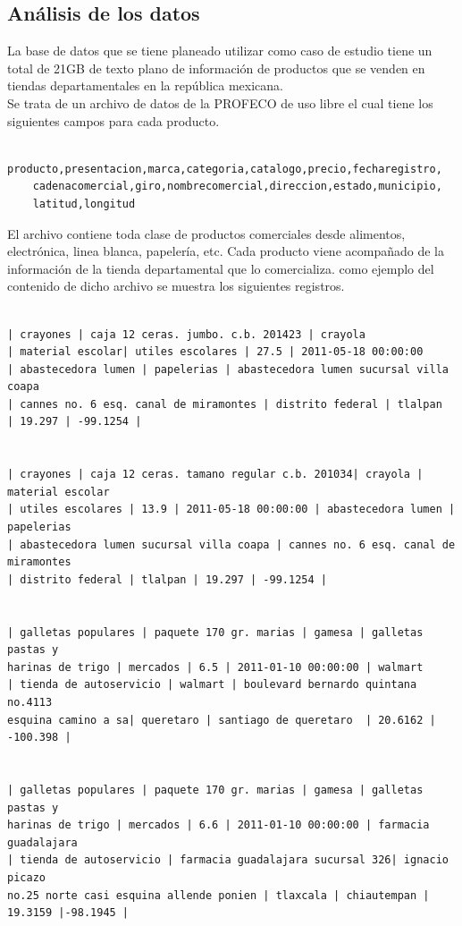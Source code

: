 \subsection{Análisis de los datos}
La base de datos que se tiene planeado utilizar como caso de estudio tiene un total de 21GB de texto plano de información de productos que se venden en tiendas departamentales en la república mexicana. 
\\
Se trata de un archivo de datos de la PROFECO de uso libre el cual tiene los siguientes campos para cada producto.
\begin{lstlisting} 
	producto,presentacion,marca,categoria,catalogo,precio,fecharegistro,
	cadenacomercial,giro,nombrecomercial,direccion,estado,municipio,
	latitud,longitud
\end{lstlisting}
El archivo contiene toda clase de productos comerciales desde alimentos, electrónica, linea blanca, papelería, etc. 
Cada producto viene acompañado de la información de la tienda departamental que lo comercializa.
como ejemplo del contenido de dicho archivo se muestra los siguientes registros.
\begin{lstlisting} 

| crayones | caja 12 ceras. jumbo. c.b. 201423 | crayola 
| material escolar| utiles escolares | 27.5 | 2011-05-18 00:00:00 
| abastecedora lumen | papelerias | abastecedora lumen sucursal villa coapa 
| cannes no. 6 esq. canal de miramontes | distrito federal | tlalpan 
| 19.297 | -99.1254 |


| crayones | caja 12 ceras. tamano regular c.b. 201034| crayola | material escolar 
| utiles escolares | 13.9 | 2011-05-18 00:00:00 | abastecedora lumen | papelerias 
| abastecedora lumen sucursal villa coapa | cannes no. 6 esq. canal de miramontes 
| distrito federal | tlalpan | 19.297 | -99.1254 |


| galletas populares | paquete 170 gr. marias | gamesa | galletas pastas y 
harinas de trigo | mercados | 6.5 | 2011-01-10 00:00:00 | walmart 
| tienda de autoservicio | walmart | boulevard bernardo quintana no.4113 
esquina camino a sa| queretaro | santiago de queretaro  | 20.6162 | -100.398 |


| galletas populares | paquete 170 gr. marias | gamesa | galletas pastas y 
harinas de trigo | mercados | 6.6 | 2011-01-10 00:00:00 | farmacia guadalajara 
| tienda de autoservicio | farmacia guadalajara sucursal 326| ignacio picazo 
no.25 norte casi esquina allende ponien | tlaxcala | chiautempan | 19.3159 |-98.1945 |
\end{lstlisting}
